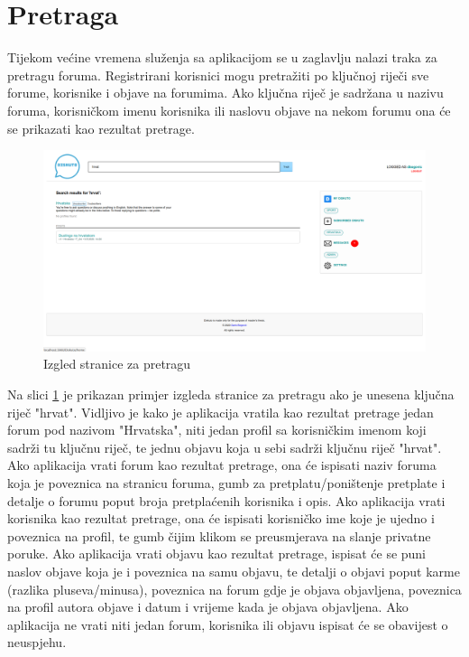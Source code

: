 \documentclass{foi}
\begin{document}
\section{Pretraga}

Tijekom većine vremena služenja sa aplikacijom se u zaglavlju nalazi traka za pretragu foruma. Registrirani korisnici mogu pretražiti po ključnoj riječi sve forume, korisnike i objave na forumima. Ako ključna riječ je sadržana u nazivu foruma, korisničkom imenu korisnika ili naslovu objave na nekom forumu ona će se prikazati kao rezultat pretrage.

\begin{figure}[h!]
    \centering
    \includegraphics[width=1\textwidth]{slike/pretraga.png}
    \caption{Izgled stranice za pretragu}
    \label{pretraga}
\end{figure}

Na slici \ref{pretraga} je prikazan primjer izgleda stranice za pretragu ako je unesena ključna riječ "hrvat". Vidljivo je kako je aplikacija vratila kao rezultat pretrage jedan forum pod nazivom "Hrvatska", niti jedan profil sa korisničkim imenom koji sadrži tu ključnu riječ, te jednu objavu koja u sebi sadrži ključnu riječ "hrvat". Ako aplikacija vrati forum kao rezultat pretrage, ona će ispisati naziv foruma koja je poveznica na stranicu foruma, gumb za pretplatu/poništenje pretplate i detalje o forumu poput broja pretplaćenih korisnika i opis. Ako aplikacija vrati korisnika kao rezultat pretrage, ona će ispisati korisničko ime koje je ujedno i poveznica na profil, te gumb čijim klikom se preusmjerava na slanje privatne poruke. Ako aplikacija vrati objavu kao rezultat pretrage, ispisat će se puni naslov objave koja je i poveznica na samu objavu, te detalji o objavi poput karme (razlika pluseva/minusa), poveznica na forum gdje je objava objavljena, poveznica na profil autora objave i datum i vrijeme kada je objava objavljena. Ako aplikacija ne vrati niti jedan forum, korisnika ili objavu ispisat će se obavijest o neuspjehu.
\end{document}
